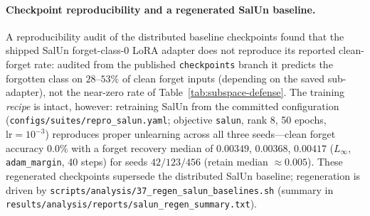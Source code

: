 \documentclass[11pt]{article}
\begin{document}
\paragraph{Checkpoint reproducibility and a regenerated SalUn baseline.} A reproducibility audit of the distributed baseline checkpoints found that the shipped SalUn forget-class-0 LoRA adapter does not reproduce its reported clean-forget rate: audited from the published \texttt{checkpoints} branch it predicts the forgotten class on $28$--$53\%$ of clean forget inputs (depending on the saved sub-adapter), not the near-zero rate of Table~\ref{tab:subspace-defense}. The training \emph{recipe} is intact, however: retraining SalUn from the committed configuration (\texttt{configs/suites/repro\_salun.yaml}; objective \texttt{salun}, rank 8, 50 epochs, $\mathrm{lr}=10^{-3}$) reproduces proper unlearning across all three seeds---clean forget accuracy $0.0\%$ with a forget recovery median of $0.00349$, $0.00368$, $0.00417$ ($L_\infty$, \texttt{adam\_margin}, 40 steps) for seeds $42/123/456$ (retain median $\approx 0.005$). These regenerated checkpoints supersede the distributed SalUn baseline; regeneration is driven by \texttt{scripts/analysis/37\_regen\_salun\_baselines.sh} (summary in \texttt{results/analysis/reports/salun\_regen\_summary.txt}).
\end{document}
